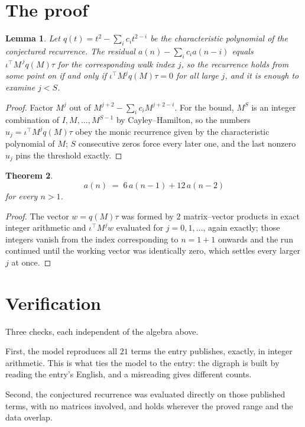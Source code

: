 \documentclass[11pt,a4paper]{article}
\theoremstyle{plain}
\newtheorem{theorem}{Theorem}
\newtheorem{lemma}[theorem]{Lemma}
\theoremstyle{definition}
\begin{document}
\section{The proof}

\begin{lemma}\label{lem:crit}
Let $q(t)=t^{2}-\sum_i c_it^{2-i}$ be the characteristic polynomial of the
conjectured recurrence. The residual $a(n)-\sum_ic_ia(n-i)$ equals
$\iota^{\!\top}M^{\,j}q(M)\tau$ for the corresponding walk index $j$, so the recurrence
holds from some point on if and only if $\iota^{\!\top}M^{j}q(M)\tau=0$ for all large $j$,
and it is enough to examine $j<S$.
\end{lemma}

\begin{proof}
Factor $M^{j}$ out of $M^{j+2}-\sum_ic_iM^{j+2-i}$. For the bound, $M^{S}$
is an integer combination of $I,M,\dots,M^{S-1}$ by Cayley--Hamilton, so the numbers
$u_j=\iota^{\!\top}M^{j}q(M)\tau$ obey the monic recurrence given by the characteristic
polynomial of $M$; $S$ consecutive zeros force every later one, and the last nonzero $u_j$
pins the threshold exactly.
\end{proof}

\begin{theorem}
\[
a(n)\;=\;6\,a(n-1) + 12\,a(n-2)
\]
for every $n>1$.
\end{theorem}

\begin{proof}
The vector $w=q(M)\tau$ was formed by $2$ matrix--vector products in exact integer
arithmetic and $\iota^{\!\top}M^{j}w$ evaluated for $j=0,1,\dots$, again exactly; those
integers vanish from the index corresponding to $n=1+1$ onwards and the run continued
until the working vector was identically zero, which settles every larger $j$ at once.
\end{proof}

\section{Verification}

Three checks, each independent of the algebra above.

First, the model reproduces all $21$ terms the entry publishes, exactly, in integer
arithmetic. This is what ties the model to the entry: the digraph is built by reading the
entry's English, and a misreading gives different counts.

Second, the conjectured recurrence was evaluated directly on those published terms, with no
matrices involved, and holds wherever the proved range and the data overlap.
\end{document}
